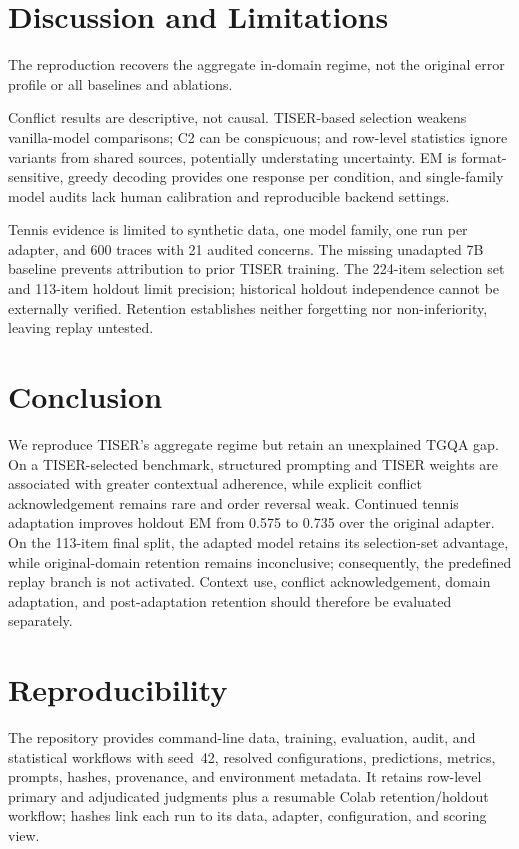 \documentclass[conference]{IEEEtran}
\begin{document}
\section{Discussion and Limitations}

The reproduction recovers the aggregate in-domain regime, not the original error profile or all baselines and ablations.

Conflict results are descriptive, not causal. TISER-based selection weakens vanilla-model comparisons; C2 can be conspicuous; and row-level statistics ignore variants from shared sources, potentially understating uncertainty. EM is format-sensitive, greedy decoding provides one response per condition, and single-family model audits lack human calibration and reproducible backend settings.

Tennis evidence is limited to synthetic data, one model family, one run per adapter, and 600 traces with 21 audited concerns. The missing unadapted 7B baseline prevents attribution to prior TISER training. The 224-item selection set and 113-item holdout limit precision; historical holdout independence cannot be externally verified. Retention establishes neither forgetting nor non-inferiority, leaving replay untested.

\section{Conclusion}

We reproduce TISER's aggregate regime but retain an unexplained TGQA gap. On a TISER-selected benchmark, structured prompting and TISER weights are associated with greater contextual adherence, while explicit conflict acknowledgement remains rare and order reversal weak. Continued tennis adaptation improves holdout EM from 0.575 to 0.735 over the original adapter. On the 113-item final split, the adapted model retains its selection-set advantage, while original-domain retention remains inconclusive; consequently, the predefined replay branch is not activated. Context use, conflict acknowledgement, domain adaptation, and post-adaptation retention should therefore be evaluated separately.

\section{Reproducibility}

The repository provides command-line data, training, evaluation, audit, and statistical workflows with seed~42, resolved configurations, predictions, metrics, prompts, hashes, provenance, and environment metadata. It retains row-level primary and adjudicated judgments plus a resumable Colab retention/holdout workflow; hashes link each run to its data, adapter, configuration, and scoring view.
\end{document}
